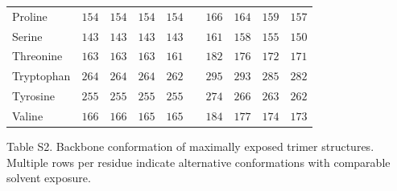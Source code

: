 \documentclass[12pt]{article}
\begin{document}
\begin{center}
\begin{tabular}{lccccccccc}
Proline          & $154$ & $154$ & $154$ & $154$ & & $166$ & $164$ & $159$ & $157$\\
Serine           & $143$ & $143$ & $143$ & $143$ & & $161$ & $158$ & $155$ & $150$\\
Threonine        & $163$ & $163$ & $163$ & $161$ & & $182$ & $176$ & $172$ & $171$\\
Tryptophan       & $264$ & $264$ & $264$ & $262$ & & $295$ & $293$ & $285$ & $282$\\
Tyrosine         & $255$ & $255$ & $255$ & $255$ & & $274$ & $266$ & $263$ & $262$\\
Valine           & $166$ & $166$ & $165$ & $165$ & & $184$ & $177$ & $174$ & $173$\\
\hline
\end{tabular}
\end{center}


\newpage
\noindent Table S2. Backbone conformation of maximally exposed trimer structures. Multiple rows per residue indicate alternative conformations with comparable solvent exposure.
\end{document}
